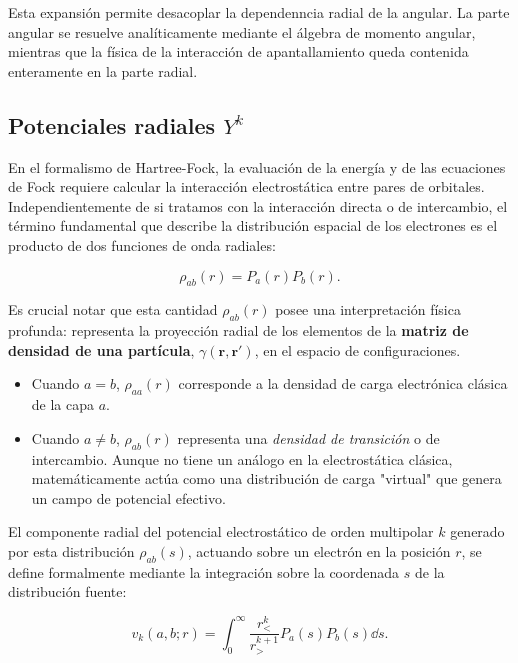 Esta expansión permite desacoplar la dependenncia radial de la angular. La parte angular se resuelve analíticamente mediante el álgebra de momento angular, mientras que la física de la interacción de apantallamiento queda contenida enteramente en la parte radial.

\subsection{Potenciales radiales $Y^k$}

En el formalismo de Hartree-Fock, la evaluación de la energía y de las ecuaciones de Fock requiere calcular la interacción electrostática entre pares de orbitales. Independientemente de si tratamos con la interacción directa o de intercambio, el término fundamental que describe la distribución espacial de los electrones es el producto de dos funciones de onda radiales:

\begin{equation}
\label{eq:pair-density}
    \rho_{ab}(r) = P_a(r) P_b(r).
\end{equation}

Es crucial notar que esta cantidad $\rho_{ab}(r)$ posee una interpretación física profunda: representa la proyección radial de los elementos de la \textbf{matriz de densidad de una partícula}, $\gamma(\mathbf{r}, \mathbf{r}')$, en el espacio de configuraciones.

\begin{itemize}
\item Cuando $a = b$, $\rho_{aa}(r)$ corresponde a la densidad de carga electrónica clásica de la capa $a$.
\item Cuando $a \neq b$, $\rho_{ab}(r)$ representa una \textit{densidad de transición} o de intercambio. Aunque no tiene un análogo en la electrostática clásica, matemáticamente actúa como una distribución de carga "virtual" que genera un campo de potencial efectivo.
\end{itemize}

El componente radial del potencial electrostático de orden multipolar $k$ generado por esta distribución $\rho_{ab}(s)$, actuando sobre un electrón en la posición $r$, se define formalmente mediante la integración sobre la coordenada $s$ de la distribución fuente:

\begin{equation}
 \label{eq:vk-integral}
 v_k(a,b;r) = \int_0^{\infty} \frac{r_<^k}{r_>^{k+1}} P_a(s)P_b(s)\dd{s}.
\end{equation}

